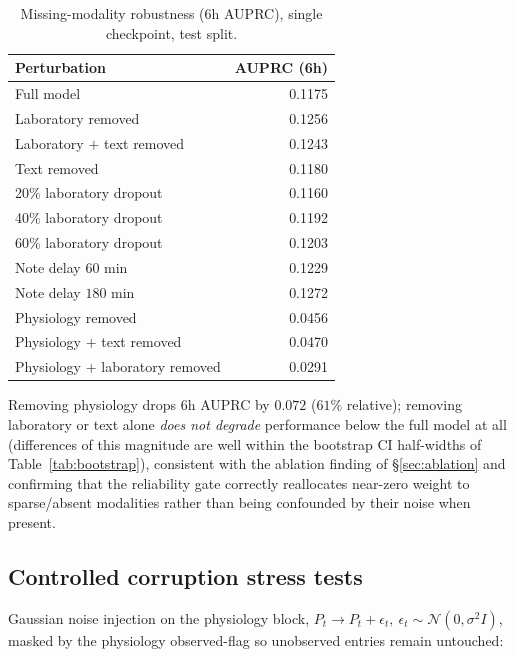 \documentclass[11pt]{article}
\newcommand{\1}[1]{\mathbf{1}\!\left[#1\right]}
\begin{document}
\begin{table}[h]
\centering
\caption{Missing-modality robustness (6h AUPRC), single checkpoint, test split.}
\begin{tabular}{lr}
\toprule
Perturbation & AUPRC (6h) \\
\midrule
Full model & 0.1175 \\
Laboratory removed & 0.1256 \\
Laboratory $+$ text removed & 0.1243 \\
Text removed & 0.1180 \\
20\% laboratory dropout & 0.1160 \\
40\% laboratory dropout & 0.1192 \\
60\% laboratory dropout & 0.1203 \\
Note delay $60$ min & 0.1229 \\
Note delay $180$ min & 0.1272 \\
Physiology removed & 0.0456 \\
Physiology $+$ text removed & 0.0470 \\
Physiology $+$ laboratory removed & 0.0291 \\
\bottomrule
\end{tabular}
\end{table}
Removing physiology drops $6$h AUPRC by $0.072$ ($61\%$ relative); removing laboratory or text alone \emph{does not degrade} performance below the full model at all (differences of this magnitude are well within the bootstrap CI half-widths of Table~\ref{tab:bootstrap}), consistent with the ablation finding of \S\ref{sec:ablation} and confirming that the reliability gate correctly reallocates near-zero weight to sparse/absent modalities rather than being confounded by their noise when present.

\subsection{Controlled corruption stress tests}

Gaussian noise injection on the physiology block, $P_t \to P_t + \epsilon_t,\ \epsilon_t\sim\mathcal N(0,\sigma^2 I)$, masked by the physiology observed-flag so unobserved entries remain untouched:
\end{document}
